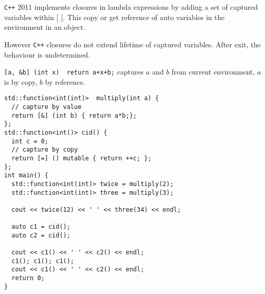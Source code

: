 \vspace*{\fill}
\columnbreak

\texttt{C++} 2011 implements closures in lambda expressions by adding a set of captured variables within [ ]. This copy or get reference of auto variables in the environment in an object.

However \texttt{C++} closures do not extend lifetime of captured variables. After exit, the behaviour is undetermined.

\texttt{[a, &b] (int x) { return a+x+b;}} captures $a$ and $b$ from current environment, $a$ is by copy, $b$ by reference.
\begin{listing}[H]

\begin{verbatim}
std::function<int(int)>  multiply(int a) {
  // capture by value
  return [&] (int b) { return a*b;};
};
std::function<int()> cid() {
  int c = 0;
  // capture by copy
  return [=] () mutable { return ++c; };
};
int main() {
  std::function<int(int)> twice = multiply(2);
  std::function<int(int)> three = multiply(3);

  cout << twice(12) << ' ' << three(34) << endl;

  auto c1 = cid();
  auto c2 = cid();

  cout << c1() << ' ' << c2() << endl;
  c1(); c1(); c1();
  cout << c1() << ' ' << c2() << endl;
  return 0;
}
\end{verbatim}

\caption{}
\label{code:code7}
\end{listing}
